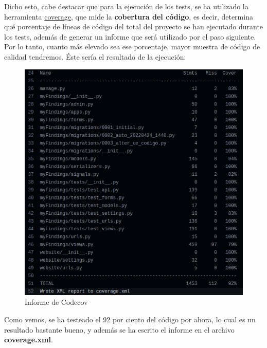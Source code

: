 \begin{enumerate}
\begin{enumerate}
\begin{enumerate}
                        Dicho esto, cabe destacar que para la ejecución de los tests, se ha
                        utilizado la herramienta \href{https://pypi.org/project/coverage/}
                        {coverage}, que mide la \textbf{cobertura del código}, es decir,
                        determina qué porcentaje de líneas de código del total del proyecto
                        se han ejecutado durante los tests, además de generar un informe que
                        será utilizado por el paso siguiente. Por lo tanto, cuanto más
                        elevado sea ese porcentaje, mayor muestra de código de calidad
                        tendremos. Éste sería el resultado de la ejecución:

                                \begin{figure}[H]
                                    \centering
                                    \includegraphics[scale=0.40]{imagenes/codecov-report.png}
                                    \caption{Informe de Codecov}
                                    \label{fig:codecov-report}
                                \end{figure}
                        
                        Como vemos, se ha testeado el 92 por ciento del código por ahora, lo
                        cual es un resultado bastante bueno, y además se ha escrito el
                        informe en el archivo \textbf{coverage.xml}.
                        

\end{enumerate}
\end{enumerate}
\end{enumerate}
